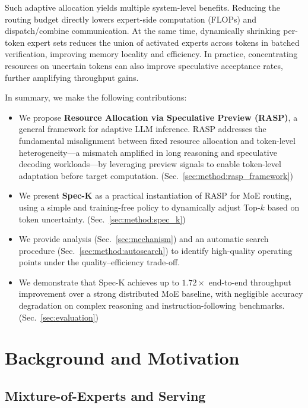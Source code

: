 \documentclass[conference]{IEEEtran}
\theoremstyle{definition} %
\begin{document}
Such adaptive allocation yields multiple system-level benefits. 
Reducing the routing budget directly lowers expert-side computation (FLOPs) and dispatch/combine communication. 
At the same time, dynamically shrinking per-token expert sets reduces the union of activated experts across tokens in batched verification, improving memory locality and efficiency. 
In practice, concentrating resources on uncertain tokens can also improve speculative acceptance rates, further amplifying throughput gains.

In summary, we make the following contributions:

\begin{itemize}
    \item We propose \textbf{Resource Allocation via Speculative Preview (RASP)}, a general framework for adaptive LLM inference. RASP addresses the fundamental misalignment between fixed resource allocation and token-level heterogeneity---a mismatch amplified in long reasoning and speculative decoding workloads---by leveraging preview signals to enable token-level adaptation before target computation. (Sec.~\ref{sec:method:rasp_framework})

    \item We present \textbf{Spec-K} as a practical instantiation of RASP for MoE routing, using a simple and training-free policy to dynamically adjust Top-$k$ based on token uncertainty. (Sec.~\ref{sec:method:spec_k})

    \item We provide analysis (Sec.~\ref{sec:mechanism}) and an automatic search procedure (Sec.~\ref{sec:method:autosearch}) to identify high-quality operating points under the quality–efficiency trade-off.

    \item We demonstrate that Spec-K achieves up to $1.72\times$ end-to-end throughput improvement over a strong distributed MoE baseline, with negligible accuracy degradation on complex reasoning and instruction-following benchmarks. (Sec.~\ref{sec:evaluation})
\end{itemize}


\section{Background and Motivation}

\subsection{Mixture-of-Experts and Serving}
\end{document}
